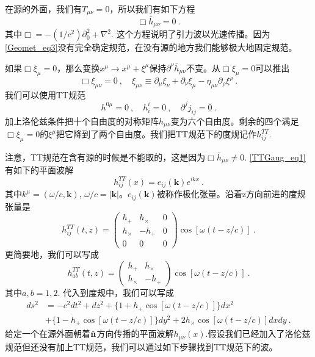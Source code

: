 在源的外面，我们有$T_{\mu\nu} = 0$，所以我们有如下方程
\begin{equation}\label{TTGaug_eq1}
\Box \bar h_{\mu\nu} = 0 ~.
\end{equation}
其中$\Box = - (1/c^2) \partial_0^2 +\nabla^2$. 这个方程说明了引力波以光速传播。因为\autoref{Geomet_eq3}没有完全确定规范，在没有源的地方我们能够极大地固定规范。

如果$\Box \xi_\mu = 0$，那么变换$x^\mu \rightarrow x^\mu+\xi^\mu$保持$\partial^\nu \bar h_{\mu\nu}$不变。从$\Box \xi_\mu = 0$可以推出
\begin{equation}
\Box \xi_{\mu\nu} = 0~, \quad \xi_{\mu\nu} \equiv \partial_{\mu} \xi_\nu +\partial_\nu \xi_\mu - \eta_{\mu\nu} \partial_\rho\xi^\rho~. 
\end{equation}
我们可以使用TT规范
\begin{equation}
h^{0\mu} = 0~, \quad h^i_i = 0~, \quad \partial^j j_{ij} = 0~.
\end{equation}
加上洛伦兹条件把十个自由度的对称矩阵$h_{\mu\nu}$变为六个自由度。剩余的四个满足$\Box \xi_\mu = 0$的$\xi^\mu$把它降到了两个自由度。我们把TT规范下的度规记作$h_{ij}^{TT}$. 

注意，TT规范在含有源的时候是不能取的，这是因为$\Box \bar h_{\mu\nu} \neq 0$. \autoref{TTGaug_eq1}有如下的平面波解
\begin{equation}
h_{ij}^{TT} (x) = e_{ij} (\mathbf k) e^{ikx} ~.  
\end{equation}
其中$k^\mu = (\omega/c,\mathbf k)$, $\omega/c = |\mathbf k|$。$e_{ij}(\mathbf k)$被称作极化张量。沿着z方向前进的度规张量是
\begin{equation}
h_{ij}^{TT} (t,z) = 
\begin{pmatrix}
h_+ & h_\times & 0 \\
h_\times & - h_+ & 0 \\
0 & 0 & 0
\end{pmatrix} \cos [\omega (t - z/c)]~. 
\end{equation}
更简要地，我们可以写成
\begin{equation}\label{TTGaug_eq2}
h_{ab}^{TT} (t,z) = 
\begin{pmatrix}
h_+ & h_\times   \\
h_\times & - h_+   
\end{pmatrix} \cos [\omega (t - z/c)]~. 
\end{equation}
其中$a,b = 1,2$. 代入到度规中，我们可以写成
\begin{equation}
\begin{aligned}
ds^2 & = - c^2 dt^2 + dz^2 + \{ 1+ h_+ \cos [\omega(t-z/c)] \} dx^2 \\
& + \{ 1-h_+ \cos [\omega(t-z/c)] \} dy^2 + 2 h_\times \cos[\omega(t-z/c)] dx dy~.
\end{aligned}
\end{equation}
给定一个在源外面朝着$\hat{\bf{n}}$方向传播的平面波解$h_{\mu\nu}(x)$.假设我们已经加入了洛伦兹规范但还没有加上TT规范，我们可以通过如下步骤找到TT规范下的波。

